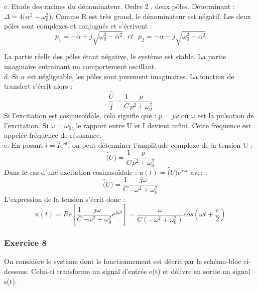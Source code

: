\documentclass[11pt]{report}
\begin{document}
 	c. Etude des racines du dénominateur. Ordre 2 , deux pôles.
 	Déterminant : $\Delta=4(\alpha^2-\omega_{0}^2$). Comme R est très grand, le dénominateur est négatif. Les deux pôles sont complexes et conjugués et s'écrivent :
 	\begin{equation*}
 	p_1=-\alpha+j\sqrt{\omega_{0}^2-\alpha^2}~~~et~~~p_2=-\alpha-j\sqrt{\omega_{0}^2-\alpha^2}
 	\end{equation*}
 	
 	La partie réelle des pôles étant négative, le système est stable. La partie imaginaire entrainant un comportement oscillant. \\
 	
 	d. Si $\alpha$ est négligeable, les pôles sont purement imaginaires. La fonction de transfert s'écrit alors :
 	\begin{equation*}
 	\frac{\hat{U}}{\hat{I}}=\frac{1}{C}\frac{p}{p^2+\omega_0^2}
 	\end{equation*}
 	Si l'excitation est cosinusoïdale, cela signifie que : $p = j\omega$ où $\omega$ est la pulsation de l'excitation. Si $\omega=\omega_0$, le rapport entre U et I devient infini. Cette fréquence est appelée fréquence de résonance.\\
 	
 	e. En posant $i=\hat{I}e^{pt}$, on peut déterminer l'amplitude complexe de la tension U : 
 	\begin{equation*}
 	\hat(U)=\frac{1}{C}\frac{p}{p^2+\omega_0^2}
 	\end{equation*}
 	Dans le cas d'une excitation cosinusoïdale : $u(t)=\hat(U)e^{j\omega t}$ avec :
 	\begin{equation*}
 	\hat(U)=\frac{1}{C}\frac{j\omega}{-\omega^2+\omega_0^2}
 	\end{equation*}
 	L'expression de la tension s'écrit donc :
 	\begin{equation*}
 	u(t)=Re[\frac{1}{C}\frac{j\omega}{-\omega^2+\omega_0^2}e^{j\omega t}]=\frac{\omega}{C(-\omega^2+\omega_0^2)}cos(\omega t+\frac{\pi}{2})
 	\end{equation*}
 	
 	
 	
 	
 	
 	\subsubsection{Exercice 8}
 	
 	On considère le système dont le fonctionnement est décrit par le schéma-bloc ci-dessous. Celui-ci transforme un signal d'entrée e(t) et délivre en sortie un signal s(t). 
 	
\end{document}
